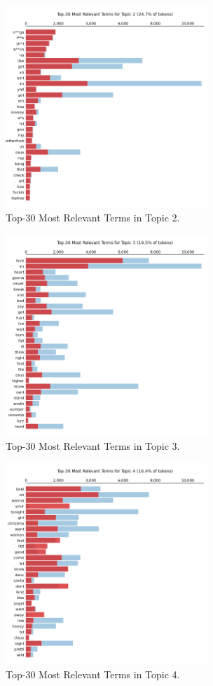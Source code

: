\begin{center}
\begin{figure}[H]
  \centering
  \includegraphics[width=3in]{img/topics/png/t2.png}
  \caption{Top-30 Most Relevant Terms in Topic 2.}
  \label{Figure:fig_eh}
\end{figure}
\end{center}

\begin{center}
\begin{figure}[H]
  \centering
  \includegraphics[width=3in]{img/topics/png/t3.png}
  \caption{Top-30 Most Relevant Terms in Topic 3.}
  \label{Figure:t3}
\end{figure}
\end{center}

\begin{center}
\begin{figure}[H]
  \centering
  \includegraphics[width=3in]{img/topics/png/t4.png}
  \caption{Top-30 Most Relevant Terms in Topic 4.}
  \label{Figure:fig_eh}
\end{figure}
\end{center}

